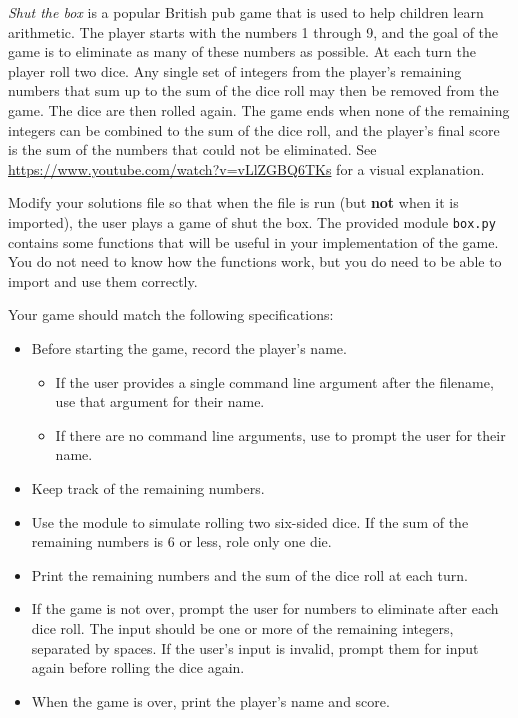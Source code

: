 \begin{problem} %
\emph{Shut the box} is a popular British pub game that is used to help children learn arithmetic.
The player starts with the numbers 1 through 9, and the goal of the game is to eliminate as many of these numbers as possible.
At each turn the player roll two dice.
Any single set of integers from the player's remaining numbers that sum up to the sum of the dice roll may then be removed from the game.
The dice are then rolled again.
The game ends when none of the remaining integers can be combined to the sum of the dice roll, and the player's final score is the sum of the numbers that could not be eliminated.
See \url{https://www.youtube.com/watch?v=vLlZGBQ6TKs} for a visual explanation.

Modify your solutions file so that when the file is run (but \textbf{not} when it is imported), the user plays a game of shut the box.
The provided module \texttt{box.py} contains some functions that will be useful in your implementation of the game.
You do not need to know how the functions work, but you do need to be able to import and use them correctly.

Your game should match the following specifications:

\begin{itemize}
\item Before starting the game, record the player's name.
\begin{itemize}
    \item If the user provides a single command line argument after the filename, use that argument for their name.
    \item If there are no command line arguments, use  to prompt the user for their name.
\end{itemize}
\item Keep track of the remaining numbers.
\item Use the  module to simulate rolling two six-sided dice.
If the sum of the remaining numbers is 6 or less, role only one die.
\item Print the remaining numbers and the sum of the dice roll at each turn.
\item If the game is not over, prompt the user for numbers to eliminate after each dice roll.
The input should be one or more of the remaining integers, separated by spaces.
If the user's input is invalid, prompt them for input again before rolling the dice again.
\item When the game is over, print the player's name and score.
\end{itemize}


\end{problem}
